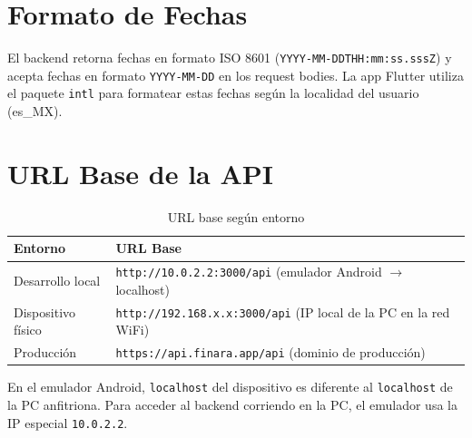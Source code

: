 \section{Formato de Fechas}

El backend retorna fechas en formato ISO 8601 (\texttt{YYYY-MM-DDTHH:mm:ss.sssZ}) y acepta fechas en formato \texttt{YYYY-MM-DD} en los request bodies. La app Flutter utiliza el paquete \texttt{intl} para formatear estas fechas según la localidad del usuario (es\_MX).

\section{URL Base de la API}

\begin{longtable}{p{3cm} p{10.5cm}}
  \caption{URL base según entorno}
  \label{tab:base-url} \\
  \toprule
  \textbf{Entorno} & \textbf{URL Base} \\
  \midrule
  Desarrollo local  & \texttt{http://10.0.2.2:3000/api} (emulador Android $\to$ localhost) \\
  Dispositivo físico & \texttt{http://192.168.x.x:3000/api} (IP local de la PC en la red WiFi) \\
  Producción        & \texttt{https://api.finara.app/api} (dominio de producción) \\
  \bottomrule
\end{longtable}

\begin{notaTecnica}
  En el emulador Android, \texttt{localhost} del dispositivo es diferente al \texttt{localhost} de la PC anfitriona. Para acceder al backend corriendo en la PC, el emulador usa la IP especial \texttt{10.0.2.2}.
\end{notaTecnica}
